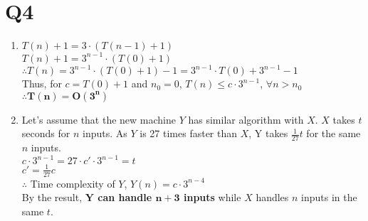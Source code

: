 \documentclass[12pt,a4paper]{article}
\begin{document}
    \section{Q4}
    \begin{enumerate}[label=(\arabic*)]
        \item
            $T(n)+1=3\cdot(T(n-1)+1)$\\
            $T(n)+1=3^{n-1}\cdot(T(0)+1)$\\
            $\therefore T(n)=3^{n-1}\cdot(T(0)+1)-1 = 3^{n-1}\cdot T(0)+3^{n-1}-1$\\
            Thus, for $c=T(0)+1$ and $n_0=0$, $T(n)\leq c\cdot 3^{n-1}$, $\forall n>n_0$\\
            $\mathbf{\therefore T(n)=O(3^n)}$

        \item
            Let's assume that the new machine $Y$ has similar algorithm with $X$.
            $X$ takes $t$ seconds for $n$ inputs. As $Y$ is 27 times faster than $X$, Y takes $\frac{1}{27}t$ for the same $n$ inputs.\\
            $c\cdot 3^{n-1} = 27\cdot c'\cdot 3^{n-1}=t$\\
            $c'=\frac{1}{27}c$\\
            $\therefore$ Time complexity of $Y$, $Y(n)=c\cdot 3^{n-4}$\\
            By the result, \textbf{$\mathbf{Y}$ can handle $\mathbf{n+3}$ inputs} while $X$ handles $n$ inputs in the same $t$.

    \end{enumerate}
\end{document}
